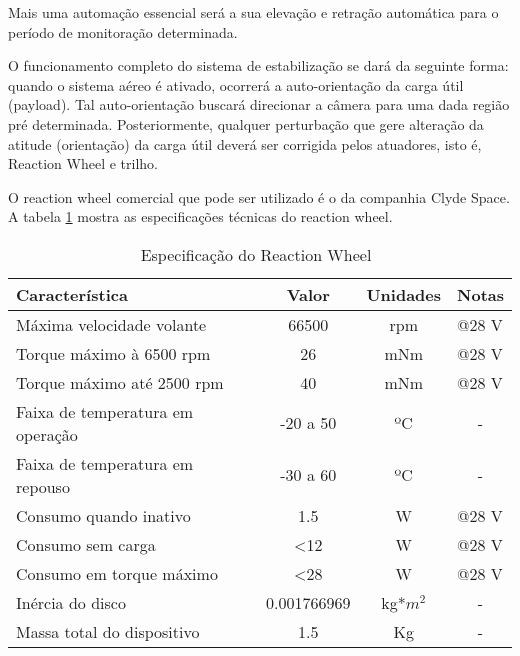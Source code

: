 Mais uma automação essencial será a sua elevação e retração automática para o período de monitoração determinada.

O funcionamento completo do sistema de estabilização se dará da seguinte forma: quando o sistema aéreo é ativado, ocorrerá a auto-orientação da carga útil (payload). Tal auto-orientação buscará direcionar a câmera para uma dada região pré determinada. Posteriormente, qualquer perturbação que gere alteração da atitude (orientação) da carga útil deverá ser corrigida pelos atuadores, isto é, Reaction Wheel e trilho.

O reaction wheel comercial que pode ser utilizado é o da companhia Clyde Space. A tabela \ref{tab:reactionWheel} mostra as especificações técnicas do reaction wheel.

\begin{table}[H]
	\centering
  \caption[Especificação do Reaction Wheel]{Especificação do Reaction Wheel~\cite{clyde}}
	\begin{tabular}{|l|c|c|l|}
	\hline
	\rowcolor[HTML]{C0C0C0}
	\textbf{Característica}          & \textbf{Valor} & \textbf{Unidades} & \textbf{Notas}        \\ \hline
	Máxima velocidade volante        & 66500          & rpm               & @28 V                 \\ \hline
	Torque máximo à 6500 rpm         & 26             & mNm               & @28 V                 \\ \hline
	Torque máximo até 2500 rpm       & 40             & mNm               & @28 V                 \\ \hline
	Faixa de temperatura em operação & -20 a 50       & ºC                & \multicolumn{1}{|c|}{-} \\ \hline
	Faixa de temperatura em repouso  & -30 a 60       & ºC                & \multicolumn{1}{|c|}{-} \\ \hline
	Consumo quando inativo           & 1.5            & W                 & @28 V                 \\ \hline
	Consumo sem carga                & \textless 12   & W                 & @28 V                 \\ \hline
	Consumo em torque máximo         & \textless 28   & W                 & @28 V                 \\ \hline
	Inércia do disco                 & 0.001766969    & kg*$m^{2}$        & \multicolumn{1}{|c|}{-} \\ \hline
	Massa total do dispositivo       & 1.5            & Kg                & \multicolumn{1}{|c|}{-} \\ \hline
	\end{tabular}
	\label{tab:reactionWheel}
\end{table}

